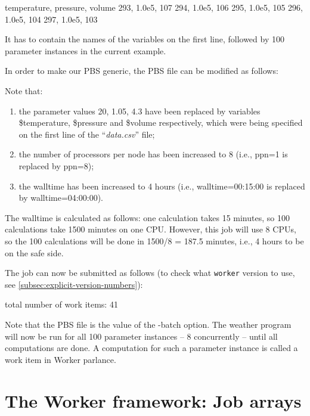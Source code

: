 \begin{prompt}
temperature, pressure, volume
293, 1.0e5, 107
294, 1.0e5, 106
295, 1.0e5, 105
296, 1.0e5, 104
297, 1.0e5, 103
\end{prompt}

It has to contain the names of the variables on the first line, followed by 100
parameter instances in the current example.

In order to make our PBS generic, the PBS file can be modified as follows:


Note that:

\begin{enumerate}
  \item  the parameter values 20, 1.05, 4.3 have been replaced by variables
    \$temperature, \$pressure and \$volume respectively, which were being specified
    on the first line of the ``\emph{data.csv}'' file;
  \item  the number of processors per node has been increased to 8 (i.e., ppn=1 is replaced by
    ppn=8);
  \item  the walltime has been increased to 4 hours (i.e.,
    walltime=00:15:00 is replaced by walltime=04:00:00).
\end{enumerate}

The walltime is calculated as follows: one calculation takes 15 minutes, so 100
calculations take 1500 minutes on one CPU. However, this job will use 8 CPUs,
so the 100 calculations will be done in 1500/8 = 187.5 minutes, i.e., 4 hours
to be on the safe side.

The job can now be submitted as follows (to check what \verb|worker| version to use,
see \autoref{subsec:explicit-version-numbers}):

\begin{prompt}
total number of work items: 41
\end{prompt}

Note that the PBS file is the value of the -batch option. The weather program
will now be run for all 100 parameter instances -- 8 concurrently -- until
all computations are done. A computation for such a parameter instance is
called a work item in Worker parlance.

\section{The Worker framework: Job arrays}

